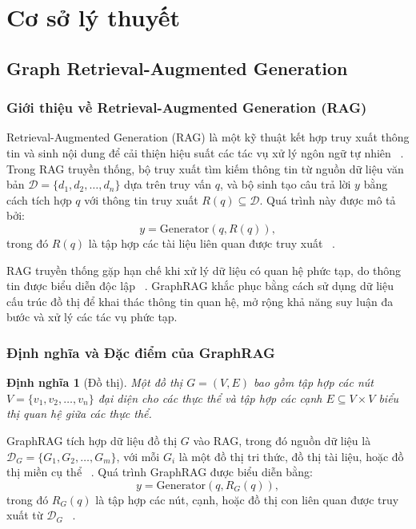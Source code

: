 \documentclass[a4paper]{article}
\newtheorem{definition}{Định nghĩa}
\begin{document}
\clearpage
\section{Cơ sở lý thuyết}
\subsection{Graph Retrieval-Augmented Generation}

\subsubsection{Giới thiệu về Retrieval-Augmented Generation (RAG)}
Retrieval-Augmented Generation (RAG) là một kỹ thuật kết hợp truy xuất thông tin và sinh nội dung để cải thiện hiệu suất các tác vụ xử lý ngôn ngữ tự nhiên ~\cite{Lewis2020RAG}. Trong RAG truyền thống, bộ truy xuất tìm kiếm thông tin từ nguồn dữ liệu văn bản $\mathcal{D} = \{d_1, d_2, \dots, d_n\}$ dựa trên truy vấn $q$, và bộ sinh tạo câu trả lời $y$ bằng cách tích hợp $q$ với thông tin truy xuất $R(q) \subseteq \mathcal{D}$. Quá trình này được mô tả bởi:
\begin{equation}
    y = \text{Generator}(q, R(q)),
\end{equation}
trong đó $R(q)$ là tập hợp các tài liệu liên quan được truy xuất ~\cite{Raffel2020T5}.

RAG truyền thống gặp hạn chế khi xử lý dữ liệu có quan hệ phức tạp, do thông tin được biểu diễn độc lập ~\cite{Chen2024GraphRAG}. GraphRAG khắc phục bằng cách sử dụng dữ liệu cấu trúc đồ thị để khai thác thông tin quan hệ, mở rộng khả năng suy luận đa bước và xử lý các tác vụ phức tạp.

\subsubsection{Định nghĩa và Đặc điểm của GraphRAG}
\begin{definition}[Đồ thị]
Một đồ thị $G = (V, E)$ bao gồm tập hợp các nút $V = \{v_1, v_2, \dots, v_n\}$ đại diện cho các thực thể và tập hợp các cạnh $E \subseteq V \times V$ biểu thị quan hệ giữa các thực thể.
\end{definition}

GraphRAG tích hợp dữ liệu đồ thị $G$ vào RAG, trong đó nguồn dữ liệu là $\mathcal{D}_G = \{G_1, G_2, \dots, G_m\}$, với mỗi $G_i$ là một đồ thị tri thức, đồ thị tài liệu, hoặc đồ thị miền cụ thể ~\cite{Liu2023GraphSurvey}. Quá trình GraphRAG được biểu diễn bằng:
\begin{equation}
    y = \text{Generator}(q, R_G(q)),
\end{equation}
trong đó $R_G(q)$ là tập hợp các nút, cạnh, hoặc đồ thị con liên quan được truy xuất từ $\mathcal{D}_G$ ~\cite{Chen2024GraphRAG}.
\end{document}

